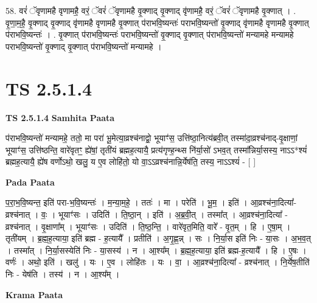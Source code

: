 \documentclass[17pt]{extarticle}
\begin{document}
58. वरं॑ ॅवृणामहै वृणामहै॒ वरं॒ ॅवरं॑ ॅवृणामहै वृ॒क्णाद् वृ॒क्णाद् वृ॑णामहै॒ वरं॒ ॅवरं॑ ॅवृणामहै वृ॒क्णात् । . वृ॒णा॒म॒है॒ वृ॒क्णाद् वृ॒क्णाद् वृ॑णामहै वृणामहै वृ॒क्णात् प॑राभवि॒ष्यन्तः॑ पराभवि॒ष्यन्तो॑ वृ॒क्णाद् वृ॑णामहै वृणामहै वृ॒क्णात् प॑राभवि॒ष्यन्तः॑ । . वृ॒क्णात् प॑राभवि॒ष्यन्तः॑ पराभवि॒ष्यन्तो॑ वृ॒क्णाद् वृ॒क्णात् प॑राभवि॒ष्यन्तो॑ मन्यामहे मन्यामहे पराभवि॒ष्यन्तो॑ वृ॒क्णाद् वृ॒क्णात् प॑राभवि॒ष्यन्तो॑ मन्यामहे । \newline
\pagebreak
{}
\section*{ TS 2.5.1.4 }

\textbf{TS 2.5.1.4 } \newline
\textbf{Samhita Paata} \newline

प॑राभवि॒ष्यन्तो॑ मन्यामहे॒ ततो॒ मा परा॑ भू॒मेत्या॒व्रश्च॑नाद्वो॒ भूयाꣳ॑स॒ उत्ति॑ष्ठा॒नित्य॑ब्रवी॒त् तस्मा॑दा॒व्रश्च॑नाद्-वृ॒क्षाणां॒ भूयाꣳ॑स॒ उत्ति॑ष्ठन्ति॒ वारे॑वृतꣳ॒॒ ह्ये॑षां॒ तृती॑यं ब्रह्मह॒त्यायै॒ प्रत्य॑गृण्ह॒न्थ्स नि॑र्या॒सो॑ ऽभव॒त् तस्मा᳚न्निर्या॒सस्य॒ नाऽऽ*श्यं॑ ब्रह्मह॒त्यायै॒ ह्ये॑ष वर्णोऽथो॒ खलु॒ य ए॒व लोहि॑तो॒ यो वा॒ऽऽव्रश्च॑नान्नि॒र्येष॑ति॒ तस्य॒ नाऽऽश्यं॑ - [  ] \newline

\textbf{Pada Paata} \newline

प॒रा॒भ॒वि॒ष्यन्त॒ इति॑ परा-भ॒वि॒ष्यन्तः॑ । म॒न्या॒म॒हे॒ । ततः॑ । मा । परेति॑ । भू॒म॒ । इति॑ । आ॒व्रश्च॑ना॒दित्या᳚-व्रश्च॑नात् । वः॒ । भूयाꣳ॑सः । उदिति॑ । ति॒ष्ठा॒न् । इति॑ । अ॒ब्र॒वी॒त् । तस्मा᳚त् । आ॒व्रश्च॑ना॒दित्या᳚ - व्रश्च॑नात् । वृ॒क्षाणा᳚म् । भूयाꣳ॑सः । उदिति॑ । ति॒ष्ठ॒न्ति॒ । वारे॑वृत॒मिति॒ वारे᳚ - वृ॒त॒म् । हि । ए॒षा॒म् । तृती॑यम् । ब्र॒ह्म॒ह॒त्याया॒ इति॑ ब्रह्म - ह॒त्यायै᳚ । प्रतीति॑ । अ॒गृ॒ह्ण॒न्न् । सः । नि॒र्या॒स इति॑ निः - या॒सः । अ॒भ॒व॒त् । तस्मा᳚त् । नि॒र्या॒सस्येति॑ निः - या॒सस्य॑ । न । आ॒श्य᳚म् । ब्र॒ह्म॒ह॒त्याया॒ इति॑ ब्रह्म-ह॒त्यायै᳚ । हि । ए॒षः । वर्णः॑ । अथो॒ इति॑ । खलु॑ । यः । ए॒व । लोहि॑तः । यः । वा॒ । आ॒व्रश्च॑ना॒दित्या᳚ - व्रश्च॑नात् । नि॒र्येष॒तीति॑ निः - येष॑ति । तस्य॑ । न । आ॒श्य᳚म् ।  \newline


\textbf{Krama Paata} \newline
\end{document}
